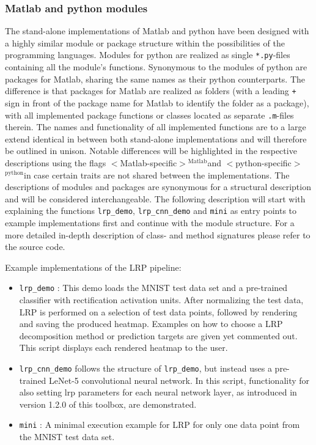 \documentclass[a4wide]{article}
\newcommand{\mat}{$^\text{Matlab}$}
\newcommand{\py}{$^\text{python}$}
\begin{document}
\subsubsection*{Matlab and python modules}
The stand-alone implementations of Matlab and python have been designed with a highly similar module or package structure within the possibilities of the programming languages. Modules for python are realized as single \texttt{*.py}-files containing all the module's functions. Synonymous to the modules of python are packages for Matlab, sharing the same names as their python counterparts. The difference is that packages for Matlab are realized as folders (with a leading \texttt{+} sign in front of the package name for Matlab to identify the folder as a package), with all implemented package functions or classes located as separate \texttt{.m}-files therein. The names and functionality of all implemented functions are to a large extend identical in between both stand-alone implementations and will therefore be outlined in unison. Notable differences will be highlighted in the respective descriptions using the flags $<$Matlab-specific$>$\mat and $<$python-specific$>$\py in case certain traits are not shared between the implementations. The descriptions of modules and packages are synonymous for a structural description and will be considered interchangeable. The following description will start with explaining the functions \texttt{lrp\_demo}, \texttt{lrp\_cnn\_demo} and \texttt{mini} as entry points to example implementations first and continue with the module structure. For a more detailed in-depth description of class- and method signatures please refer to the source code.

Example implementations of the LRP pipeline:
\begin{itemize}
\item \texttt{lrp\_demo} : This demo loads the MNIST test data set and a pre-trained classifier with rectification activation units. After normalizing the test data, LRP is performed on a selection of test data points, followed by rendering and saving the produced heatmap. Examples on how to choose a LRP decomposition method or prediction targets are given yet commented out. This script displays each rendered heatmap to the user.

\item \texttt{lrp\_cnn\_demo} follows the structure of \texttt{lrp\_demo}, but instead uses a pre-trained LeNet-5 convolutional neural network. In this script, functionality for also setting lrp parameters for each neural network layer, as introduced in version 1.2.0 of this toolbox, are demonstrated.

\item \texttt{mini} : A minimal execution example for LRP for only one data point from the MNIST test data set.
\end{itemize}
\end{document}
